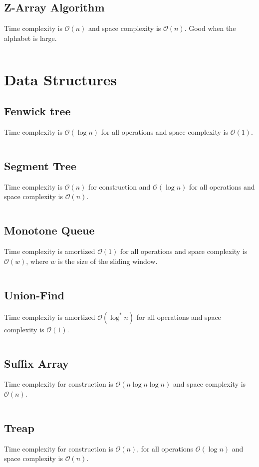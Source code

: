 \documentclass[8pt,a4paper,landscape,oneside]{amsart}
\newcommand{\code}[1]{\inputminted[fontsize=\normalsize,baselinestretch=1]{java}{code/#1}}
\newcommand{\bigO}{\mathcal{O}}
\begin{document}
\begin{multicols*}{3}
  \subsection{Z-Array Algorithm}
  Time complexity is $\bigO(n)$ and space complexity is $\bigO(n)$. Good when the alphabet is large.
  \code{Structures/ZArray.java}
  
  
\section{Data Structures}
  \subsection{Fenwick tree}
  Time complexity is $\bigO(\log n)$ for all operations and space complexity is $\bigO(1)$.
  \code{Structures/Fenwick.java}
  
  \subsection{Segment Tree}
  Time complexity is $\bigO(n)$ for construction and $\bigO(\log n)$ for all operations and space complexity is $\bigO(n)$.
  \code{Structures/SegmentTreeRMQ.java}
  
  \subsection{Monotone Queue}
  Time complexity is amortized $\bigO(1)$ for all operations and space complexity is $\bigO(w)$, where $w$ is the size of the sliding window.
  \code{Structures/MinMonoQueue.java}
  
  \subsection{Union-Find}
  Time complexity is amortized $\bigO(\log^*{n})$ for all operations and space complexity is $\bigO(1)$.
  \code{Structures/UnionFind.java}
  
  \subsection{Suffix Array}
  Time complexity for construction is $\bigO(n\log{n}\log{n})$ and space complexity is $\bigO(n)$.
  \code{Structures/SuffixArray.java}
  
  \subsection{Treap}
  Time complexity for construction is $\bigO(n)$, for all operations $\bigO(\log{n})$ and space complexity is $\bigO(n)$.
  \code{Structures/Treap.java}
  

\end{multicols*}
\end{document}
